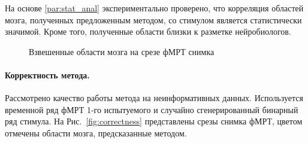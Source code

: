 На основе \ref{par:stat_anal} экспериментально проверено, что корреляция областей мозга, полученных предложенным методом, со стимулом является статистически значимой. Кроме того, полученные области близки к разметке нейробиологов.

\begin{figure}[h!]
	\centering
	\hfill
	\hfill
 \caption{Взвешенные области мозга на срезе фМРТ снимка}
\label{fig:example1}
\end{figure}

\paragraph*{Корректность метода.} Рассмотрено качество работы метода на неинформативных данных. Используется временной ряд фМРТ 1-го испытуемого и случайно сгенерированный бинарный ряд стимула. На Рис.~\ref{fig:correctness} представлены срезы снимка фМРТ, цветом отмечены области мозга, предсказанные методом.

